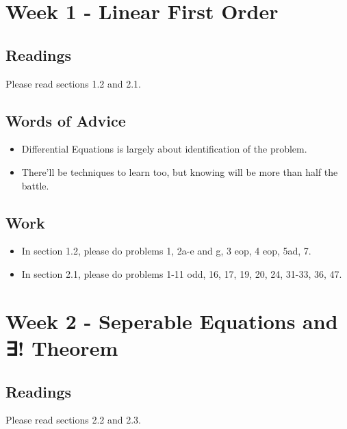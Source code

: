 

	\section{Week 1 - Linear First Order}

	\subsection{Readings}
		Please read sections 1.2 and 2.1.

	\subsection{Words of Advice}
		\begin{itemize}
			\item Differential Equations is largely about identification of the problem.
			\item There'll be techniques to learn too, but knowing will be more than half the battle.
		\end{itemize}

	\subsection{Work}
		\begin{itemize}
			\item In section 1.2, please do problems 1, 2a-e and g, 3 eop, 4 eop, 5ad, 7.
			\item In section 2.1, please do problems 1-11 odd, 16, 17, 19, 20, 24, 31-33, 36, 47.
		\end{itemize}

	\clearpage



	\section{Week 2 - Seperable Equations and ∃! Theorem}

	\subsection{Readings}
		Please read sections 2.2 and 2.3.

